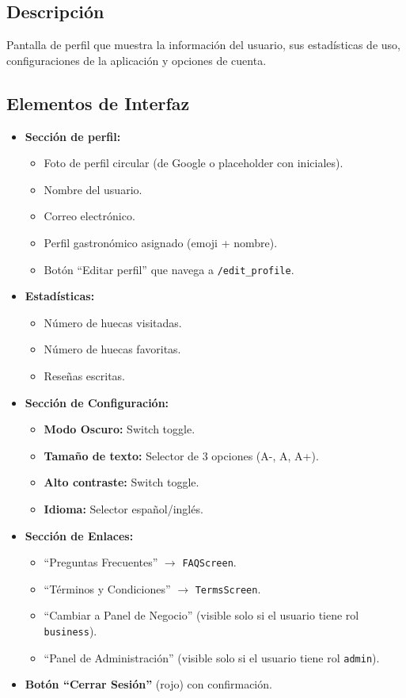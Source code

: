 \documentclass[11pt, a4paper, oneside]{report}
\begin{document}
\subsection{Descripción}
Pantalla de perfil que muestra la información del usuario, sus estadísticas de uso, configuraciones de la aplicación y opciones de cuenta.

\subsection{Elementos de Interfaz}
\begin{itemize}
  \item \textbf{Sección de perfil:}
  \begin{itemize}
    \item Foto de perfil circular (de Google o placeholder con iniciales).
    \item Nombre del usuario.
    \item Correo electrónico.
    \item Perfil gastronómico asignado (emoji + nombre).
    \item Botón ``Editar perfil'' que navega a \texttt{/edit\_profile}.
  \end{itemize}
  \item \textbf{Estadísticas:}
  \begin{itemize}
    \item Número de huecas visitadas.
    \item Número de huecas favoritas.
    \item Reseñas escritas.
  \end{itemize}
  \item \textbf{Sección de Configuración:}
  \begin{itemize}
    \item \textbf{Modo Oscuro:} Switch toggle.
    \item \textbf{Tamaño de texto:} Selector de 3 opciones (A-, A, A+).
    \item \textbf{Alto contraste:} Switch toggle.
    \item \textbf{Idioma:} Selector español/inglés.
  \end{itemize}
  \item \textbf{Sección de Enlaces:}
  \begin{itemize}
    \item ``Preguntas Frecuentes'' $\rightarrow$ \texttt{FAQScreen}.
    \item ``Términos y Condiciones'' $\rightarrow$ \texttt{TermsScreen}.
    \item ``Cambiar a Panel de Negocio'' (visible solo si el usuario tiene rol \texttt{business}).
    \item ``Panel de Administración'' (visible solo si el usuario tiene rol \texttt{admin}).
  \end{itemize}
  \item \textbf{Botón ``Cerrar Sesión''} (rojo) con confirmación.
\end{itemize}
\end{document}
